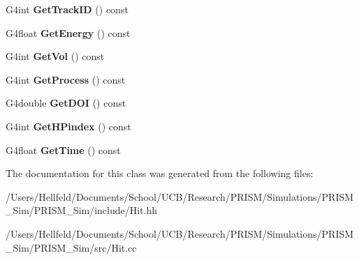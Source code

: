 \begin{DoxyCompactItemize}
\item 
\hypertarget{class_hit_ab37a81738e892f7dbd3815711d035042}{}\label{class_hit_ab37a81738e892f7dbd3815711d035042} 
G4int {\bfseries Get\+Track\+ID} () const
\item 
\hypertarget{class_hit_a0fa28030f4260a679d6795c2a73571b6}{}\label{class_hit_a0fa28030f4260a679d6795c2a73571b6} 
G4float {\bfseries Get\+Energy} () const
\item 
\hypertarget{class_hit_af6d0ad1eed934ac7cda959d463fab795}{}\label{class_hit_af6d0ad1eed934ac7cda959d463fab795} 
G4int {\bfseries Get\+Vol} () const
\item 
\hypertarget{class_hit_a02aa237952b9ca44bf54a49aa94dc3c5}{}\label{class_hit_a02aa237952b9ca44bf54a49aa94dc3c5} 
G4int {\bfseries Get\+Process} () const
\item 
\hypertarget{class_hit_a472b618b2f916b5baee2f13924134cc3}{}\label{class_hit_a472b618b2f916b5baee2f13924134cc3} 
G4double {\bfseries Get\+D\+OI} () const
\item 
\hypertarget{class_hit_a0d71eedbcad4e5f6d14f8dd34cf3f3d3}{}\label{class_hit_a0d71eedbcad4e5f6d14f8dd34cf3f3d3} 
G4int {\bfseries Get\+H\+Pindex} () const
\item 
\hypertarget{class_hit_ac88b29254adb3500e7c1364fd053bb25}{}\label{class_hit_ac88b29254adb3500e7c1364fd053bb25} 
G4float {\bfseries Get\+Time} () const
\end{DoxyCompactItemize}


The documentation for this class was generated from the following files\+:\begin{DoxyCompactItemize}
\item 
/\+Users/\+Hellfeld/\+Documents/\+School/\+U\+C\+B/\+Research/\+P\+R\+I\+S\+M/\+Simulations/\+P\+R\+I\+S\+M\+\_\+\+Sim/\+P\+R\+I\+S\+M\+\_\+\+Sim/include/Hit.\+hh\item 
/\+Users/\+Hellfeld/\+Documents/\+School/\+U\+C\+B/\+Research/\+P\+R\+I\+S\+M/\+Simulations/\+P\+R\+I\+S\+M\+\_\+\+Sim/\+P\+R\+I\+S\+M\+\_\+\+Sim/src/Hit.\+cc\end{DoxyCompactItemize}
